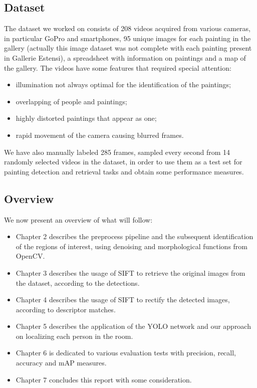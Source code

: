 \documentclass[10pt,twocolumn,letterpaper]{article}
\begin{document}
\subsection{Dataset}
\label{subsec:Dataset}
The dataset we worked on consists of 208 videos acquired from various cameras, in particular GoPro and smartphones, 95 unique images for each painting in the gallery (actually this image dataset was not complete with each painting present in Gallerie Estensi), a spreadsheet with information on paintings and a map of the gallery. The videos have some features that required special attention:
\begin{itemize}
    \item illumination not always optimal for the identification of the paintings;
    \item overlapping of people and paintings;
    \item highly distorted paintings that appear as one;
    \item rapid movement of the camera causing blurred frames.
\end{itemize}

We have also manually labeled 285 frames, sampled every second from 14 randomly selected videos in the dataset, in order to use them as a test set for painting detection and retrieval tasks and obtain some performance measures.

\subsection{Overview}
\label{subsec:Overview}
We now present an overview of what will follow:
\begin{itemize}
    \item Chapter 2 describes the preprocess pipeline and the subsequent identification of the regions of interest, using denoising and morphological functions from OpenCV.
    \item Chapter 3 describes the usage of SIFT to retrieve the original images from the dataset, according to the detections.
    \item Chapter 4 describes the usage of SIFT to rectify the detected images, according to descriptor matches.
    \item Chapter 5 describes the application of the YOLO network and our approach on localizing each person in the room.
    \item Chapter 6 is dedicated to various evaluation tests with precision, recall, accuracy and mAP measures.
    \item Chapter 7 concludes this report with some consideration.
\end{itemize}
\end{document}
